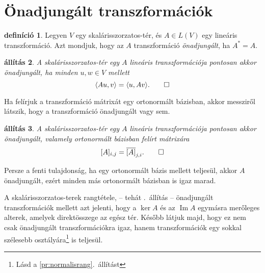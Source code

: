 \documentclass[9pt, a4paper, showtrims]{memoir}
\theoremstyle{plain}
\newtheorem{proposition}{állítás}[chapter]
\theoremstyle{remark}
\theoremstyle{definition}
\newtheorem{definition}[proposition]{definíció}
\DeclareMathOperator{\im}{Im}
\newcommand{\ip}[2]{\langle#1,#2\rangle}
\begin{document}
\section{Önadjungált transzformációk}
\begin{definition}
    Legyen $V$ egy skalárisszorzatos-tér, és $A\in L\left( V \right)$ egy lineáris transzformáció.
    Azt mondjuk, hogy az $A$ transzformáció 
    \emph{önadjungált},
    ha $A^\ast=A$.
\end{definition}

\begin{proposition}
    A skalárisszorzatos-tér egy $A$ lineáris transzformációja pontosan akkor önadjungált,
    ha minden $u,w\in V$ mellett
    \[
        \ip{Au}{v}
        =
        \ip{u}{Av}.
        \qedhere
    \]
\end{proposition}
Ha felírjuk a transzformáció mátrixát egy ortonormált bázisban, akkor messziről látszik,
hogy a transzformáció önadjungált vagy sem.
\begin{proposition}
    A skalárisszorzatos-tér egy $A$ lineáris transzformációja pontosan akkor önadjungált,
    valamely ortonormált bázisban felírt mátrixára
    \[
        [A]_{i,j}=\overline{[A]}_{j,i}.
        \qedhere
    \]
\end{proposition}
Persze a fenti tulajdonság, ha egy ortonormált bázis mellett teljesül,
akkor $A$ önadjungált, ezért minden más ortonormált bázisban is igaz marad.

A skalárisszorzatos-terek rangtétele, -- tehát .~állítás -- önadjungált transzformációk mellett azt jelenti, 
hogy
a $\ker A$ és az $\im A$ egymásra merőleges alterek, 
amelyek direktösszege az egész tér.
Később látjuk majd, hogy ez nem csak önadjungált transzformációkra igaz,
hanem transzformációk egy sokkal szélesebb osztályára\footnote{Lásd a \ref{pr:normalisrang}.~állítást} is teljesül.
\end{document}
